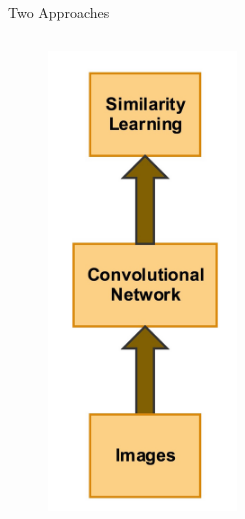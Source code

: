 \documentclass{beamer}
\begin{document}
    \begin{frame}{Two Approaches}

      \begin{columns}[c]

        \begin{figure}
          \par\medskip
          \includegraphics[width=0.45\textwidth]{images/slides/app.jpg}
        \end{figure}


\end{columns}
\end{frame}
\end{document}
